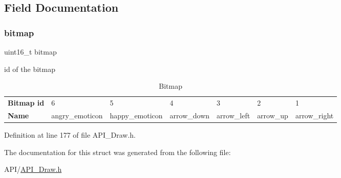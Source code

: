 \subsection{Field Documentation}
\mbox{\label{struct_b_i_t_m_a_p_a02b2be7b8ce086893453d390c5fdcf1d}} 
\subsubsection{\texorpdfstring{bitmap}{bitmap}}
{\footnotesize\ttfamily uint16\+\_\+t bitmap}



id of the bitmap 

\hypertarget{struct_b_i_t_m_a_p_Bitmap}{}
\tabulinesep=1mm
\begin{longtabu} spread 0pt [c]{*{7}{|X[-1]}|}
\caption{Bitmap}\label{struct_b_i_t_m_a_p_Bitmap}\\
\hline
\textbf{ Bitmap id }&6 &5 &4 &3 &2 &1  \\
{\bfseries Name} &angry\+\_\+emoticon &happy\+\_\+emoticon &arrow\+\_\+down &arrow\+\_\+left &arrow\+\_\+up &arrow\+\_\+right   \\
\end{longtabu}


Definition at line 177 of file A\+P\+I\+\_\+\+Draw.\+h.



The documentation for this struct was generated from the following file\+:\begin{DoxyCompactItemize}
\item 
A\+P\+I/\hyperlink{_a_p_i___draw_8h}{A\+P\+I\+\_\+\+Draw.\+h}\end{DoxyCompactItemize}
